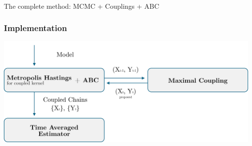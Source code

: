\documentclass{beamer}
\begin{document}
\begin{section}{The complete method: MCMC + Couplings + ABC}
	
	\begin{frame}[plain]{}
		\sectionpage
	\end{frame}
	
	\begin{frame}
		\frametitle{Implementation}
		\begin{center}
			\includegraphics[width=\textwidth]{img/Bayes3}
		\end{center}
	\end{frame}
	

\end{section}
\end{document}
